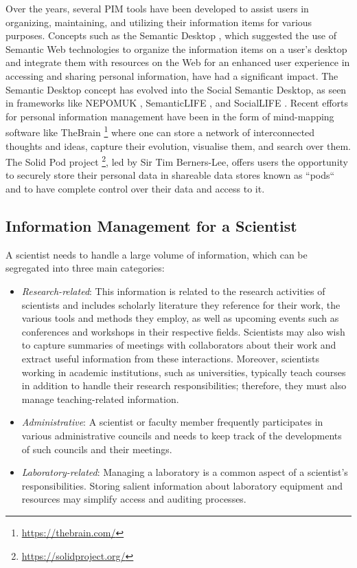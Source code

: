 \documentclass[11pt,pdftex]{article}
\begin{document}
Over the years, several PIM tools have been developed to assist users in organizing, maintaining, and utilizing their information items for various purposes.  Concepts such as the Semantic Desktop \cite{sauermann2005overview,breitman2007semantic}, which suggested the use of Semantic Web technologies \cite{berners2001semantic} to organize the information items on a user's desktop and integrate them with resources on the Web for an enhanced user experience in accessing and sharing personal information, have had a significant impact. 
The Semantic Desktop concept has evolved into the Social Semantic Desktop, as seen in frameworks like NEPOMUK \cite{groza2007nepomuk}, SemanticLIFE \cite{ahmed2004semanticlife}, and SocialLIFE \cite{vo2014sociallife}. Recent efforts for personal information management have been in the form of mind-mapping software like TheBrain \footnote{\url{https://thebrain.com/}} where one can store a network of interconnected thoughts and ideas, capture their evolution, visualise them, and search over them. The Solid Pod project \footnote{\url{https://solidproject.org/}}, led by Sir Tim Berners-Lee, offers users the opportunity to securely store their personal data in shareable data stores known as ``pods`` and to have complete control over their data and access to it. 

\subsection{Information Management for a Scientist}
A scientist needs to handle a large volume of information, which can be segregated into three main categories:
\begin{itemize}
    \item \textit{Research-related}: This information is related to the research activities of scientists and includes scholarly literature they reference for their work, the various tools and methods they employ, as well as upcoming events such as conferences and workshops in their respective fields. Scientists may also wish to capture summaries of meetings with collaborators about their work and extract useful information from these interactions. Moreover, scientists working in academic institutions, such as universities, typically teach courses in addition to handle their research responsibilities; therefore, they must also manage teaching-related information.
    
    \item \textit{Administrative}: A scientist or faculty member frequently participates in various administrative councils and needs to keep track of the developments of such councils and their meetings.
    
    \item \textit{Laboratory-related}: Managing a laboratory is a common aspect of a scientist's responsibilities. Storing salient information about laboratory equipment and resources may simplify access and auditing processes. 
\end{itemize}
\end{document}
